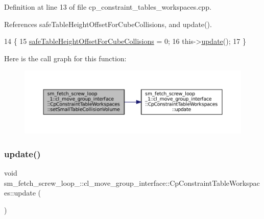 Definition at line 13 of file cp\+\_\+constraint\+\_\+tables\+\_\+workspaces.\+cpp.



References safe\+Table\+Height\+Offset\+For\+Cube\+Collisions, and update().


\begin{DoxyCode}
14         \{
15             \hyperlink{classsm__fetch__screw__loop__1_1_1cl__move__group__interface_1_1CpConstraintTableWorkspaces_a63eb3865595f71235002363b5df6c4a0}{safeTableHeightOffsetForCubeCollisions} = 0;
16             this->\hyperlink{classsm__fetch__screw__loop__1_1_1cl__move__group__interface_1_1CpConstraintTableWorkspaces_a24fc1c2ba2d6f09df2cca9bf0c3d3b20}{update}();
17         \}
\end{DoxyCode}
Here is the call graph for this function\+:
\nopagebreak
\begin{figure}[H]
\begin{center}
\leavevmode
\includegraphics[width=350pt]{classsm__fetch__screw__loop__1_1_1cl__move__group__interface_1_1CpConstraintTableWorkspaces_a9b66f921573b86d249ecafc3161d1308_cgraph}
\end{center}
\end{figure}
\mbox{\label{classsm__fetch__screw__loop__1_1_1cl__move__group__interface_1_1CpConstraintTableWorkspaces_a24fc1c2ba2d6f09df2cca9bf0c3d3b20}} 
\subsubsection{\texorpdfstring{update()}{update()}}
{\footnotesize\ttfamily void sm\+\_\+fetch\+\_\+screw\+\_\+loop\+\_\+::cl\+\_\+move\+\_\+group\+\_\+interface\+::\+Cp\+Constraint\+Table\+Workspaces\+::update (\begin{DoxyParamCaption}{ }\end{DoxyParamCaption})\hspace{0.3cm}{\ttfamily [virtual]}}



